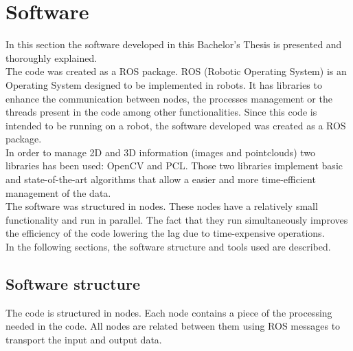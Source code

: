 \chapter{Software}

In this section the software developed in this Bachelor's Thesis is presented and thoroughly explained. 
\\

The code was created as a ROS package. ROS (Robotic Operating System) is an Operating System designed to be implemented in robots. It has libraries to enhance the communication between nodes, the processes management or the threads present in the code among other functionalities. 
Since this code is intended to be running on a robot, the software developed was created as a ROS package. 
\\

In order to manage 2D and 3D information (images and pointclouds) two libraries has been used: OpenCV and PCL. Those two libraries implement basic and state-of-the-art algorithms that allow a easier and more time-efficient management of the data. 
\\

The software was structured in nodes. These nodes have a relatively small functionality and run in parallel. The fact that they run simultaneously improves the efficiency of the code lowering the lag due to time-expensive operations. 
\\

In the following sections, the software structure and tools used are described. 


\newpage

\section{Software structure}


The code is structured in nodes. Each node contains a piece of the processing needed in the code. All nodes are related between them using ROS messages to transport the input and output data. 
\\

